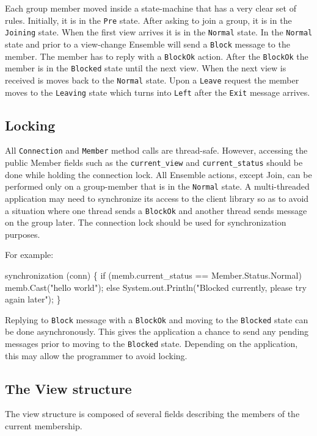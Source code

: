 Each group member moved inside a state-machine that has a very clear set
of rules. Initially, it is in the {\tt Pre} state. After asking to
join a group, it is in the {\tt Joining} state. When the first view
arrives it is in the {\tt Normal} state. In the {\tt Normal} state and
prior to a view-change Ensemble will send a {\tt Block} message to the
member. The member has to reply with a {\tt BlockOk} action. After the {\tt BlockOk} the
member is in the {\tt Blocked} state until the next view. When the
next view is received is moves back to the {\tt Normal} state. Upon a
{\tt Leave} request the member moves to the {\tt Leaving} state which
turns into {\tt Left} after the {\tt Exit} message arrives. 


\subsection{Locking}
All {\tt Connection} and {\tt Member} method calls are
thread-safe. However, accessing the public Member fields such as the
{\tt current\_view} and {\tt current\_status} should be done while
holding the connection lock. All Ensemble actions, except Join, can be performed
only on a group-member that is in the {\tt Normal} state. A
multi-threaded application may need to synchronize its access to the
client library so as to avoid a situation where one thread sends a
{\tt BlockOk} and another thread sends message on the group later. 
The connection lock should be used for synchronization purposes. 

For example:
\begin{codebox}
  synchronization (conn) 
  \{
      if (memb.current_status == Member.Status.Normal)
          memb.Cast("hello world");
       else
           System.out.Println("Blocked currently, please try again later");
  \}
\end{codebox}

Replying to {\tt Block} message with a {\tt BlockOk} and moving to the
{\tt Blocked} state can be done asynchronously. This gives the
application a chance to send any pending messages 
prior to moving to the {\tt Blocked} state. Depending on the
application, this may allow the programmer to avoid locking. 

\subsection{The View structure}
The view structure is composed of several fields describing the
members of the current membership. 


